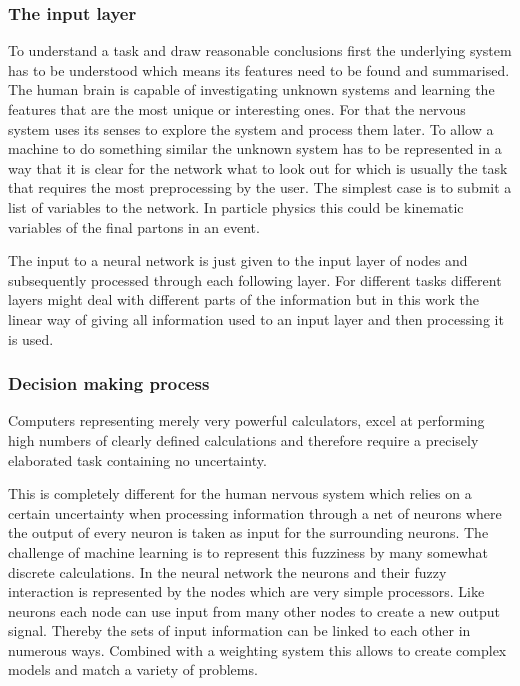 \subsubsection{The input layer}

To understand a task and draw reasonable conclusions first the underlying system has to be understood which means its features need to be found and summarised. The human brain is capable of investigating unknown systems and learning the features that are the most unique or interesting ones. For that the nervous system uses its senses to explore the system and process them later. To allow a machine to do something similar the unknown system has to be represented in a way that it is clear for the network what to look out for which is usually the task that requires the most preprocessing by the user. The simplest case is to submit a list of variables to the network. In particle physics this could be kinematic variables of the final partons in an event.

The input to a neural network is just given to the input layer of nodes and subsequently processed through each following layer. For different tasks different layers might deal with different parts of the information but in this work the linear way of giving all information used to an input layer and then processing it is used.

\subsubsection{Decision making process}

Computers representing merely very powerful calculators, excel at performing high numbers of clearly defined calculations and therefore require a precisely elaborated task containing no uncertainty.

This is completely different for the human nervous system which relies on a certain uncertainty when processing information through a net of neurons where the output of every neuron is taken as input for the surrounding neurons. The challenge of machine learning is to represent this fuzziness by many somewhat discrete calculations. In the neural network the neurons and their fuzzy interaction is represented by the nodes which are very simple processors. Like neurons each node can use input from many other nodes to create a new output signal. Thereby the sets of input information can be linked to each other in numerous ways. Combined with a weighting system this allows to create complex models and match a variety of problems.

